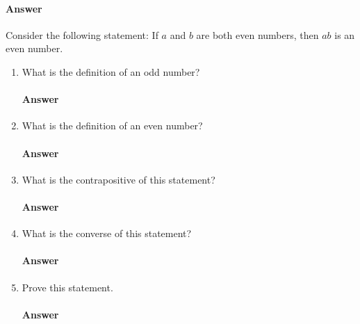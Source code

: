 \documentclass{article}
\begin{document}
\paragraph{Answer}

\todo{}

\collab{\todo{}}
Consider the following statement: If $a$ and $b$ are both even numbers, then $ab$ is
an even number.
\begin{enumerate}
    \item What is the definition of an odd number?

        \paragraph{Answer}
        \todo{}

    \item What is the definition of an even number?

        \paragraph{Answer}
        \todo{}

    \item What is the contrapositive of this statement?

        \paragraph{Answer}
        \todo{}

    \item What is the converse of this statement?

        \paragraph{Answer}
        \todo{}

    \item Prove this statement.

        \paragraph{Answer}
        \todo{}

\end{enumerate}
\end{document}
